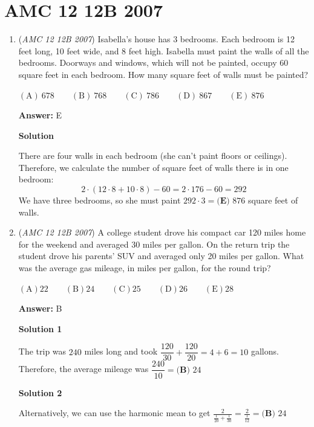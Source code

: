\section{AMC 12 12B 2007}
        \begin{enumerate}
        	\item (\textit{AMC 12 12B 2007}) Isabella's house has 3 bedrooms. Each bedroom is 12 feet long, 10 feet wide, and 8 feet high. Isabella must paint the walls of all the bedrooms. Doorways and windows, which will not be painted, occupy 60 square feet in each bedroom. How many square feet of walls must be painted? 


 $\mathrm{(A) \ } 678\qquad \mathrm{(B) \ } 768\qquad \mathrm{(C) \ } 786\qquad \mathrm{(D) \ } 867\qquad \mathrm{(E) \ } 876$

 \textbf{Answer: }E



\textbf{Solution}

There are four walls in each bedroom (she can't paint floors or ceilings). Therefore, we calculate the number of square feet of walls there is in one bedroom:
 \[2\cdot(12\cdot8+10\cdot8)-60=2\cdot176-60=292\]We have three bedrooms, so she must paint $292\cdot3=\boxed{\textbf{(E) }876}$ square feet of walls.

 


	\item (\textit{AMC 12 12B 2007}) A college student drove his compact car 120 miles home for the weekend and averaged 30 miles per gallon. On the return trip the student drove his parents' SUV and averaged only 20 miles per gallon. What was the average gas mileage, in miles per gallon, for the round trip?


 $\mathrm {(A)} 22\qquad \mathrm {(B)} 24\qquad \mathrm {(C)} 25\qquad \mathrm {(D)} 26\qquad \mathrm {(E)} 28$

 \textbf{Answer: }B



\textbf{Solution 1}

The trip was $240$ miles long and took $\dfrac{120}{30}+\dfrac{120}{20}=4+6=10$ gallons. Therefore, the average mileage was $\dfrac{240}{10}= \boxed{\textbf{(B) }24}$




\textbf{Solution 2}

Alternatively, we can use the harmonic mean to get $\frac{2}{\frac{1}{20} + \frac{1}{30}} = \frac{2}{\frac{1}{12}} = \boxed{\textbf{(B) }24}$




\end{enumerate}
